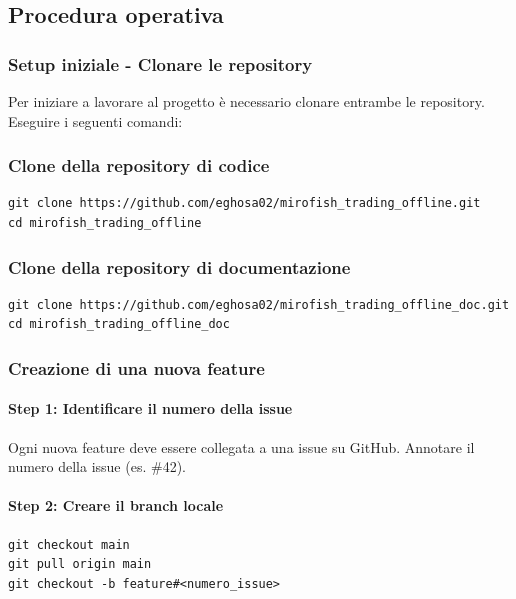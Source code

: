 \subsection{Procedura operativa}

\subsubsection{Setup iniziale - Clonare le repository}

Per iniziare a lavorare al progetto è necessario clonare entrambe le repository. Eseguire i seguenti comandi:

\subsubsection{Clone della repository di codice}
\begin{verbatim}
git clone https://github.com/eghosa02/mirofish_trading_offline.git
cd mirofish_trading_offline
\end{verbatim}

\subsubsection{Clone della repository di documentazione}
\begin{verbatim}
git clone https://github.com/eghosa02/mirofish_trading_offline_doc.git
cd mirofish_trading_offline_doc
\end{verbatim}

\subsubsection{Creazione di una nuova feature}

\paragraph{Step 1: Identificare il numero della issue}
Ogni nuova feature deve essere collegata a una issue su GitHub. Annotare il numero della issue (es. \#42).

\paragraph{Step 2: Creare il branch locale}
\begin{verbatim}
git checkout main
git pull origin main
git checkout -b feature#<numero_issue>
\end{verbatim}

